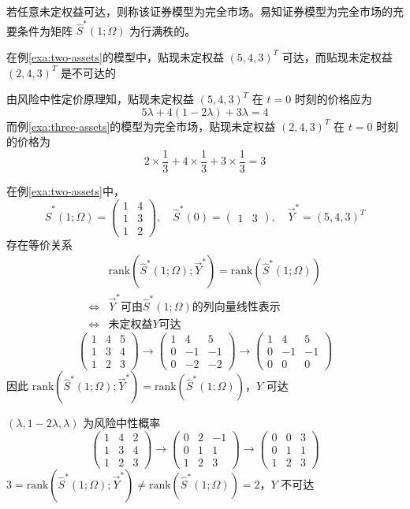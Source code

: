 若任意未定权益可达，则称该证券模型为完全市场。易知证券模型为完全市场的充要条件为矩阵 $\hat{S}^*(1;\Omega)$ 为行满秩的。

\begin{example}
    在例\ref{exa:two-assets}的模型中，贴现未定权益 $(5,4,3)^T$ 可达，而贴现未定权益 $(2,4,3)^T$ 是不可达的

    由风险中性定价原理知，贴现未定权益 $(5,4,3)^T$ 在 $t=0$ 时刻的价格应为
    \[
    5\lambda+4(1-2\lambda)+3\lambda=4
    \]
    而例\ref{exa:three-assets}的模型为完全市场，贴现未定权益 $(2,4,3)^T$ 在 $t=0$ 时刻的价格为
    \[
    2\times \frac{1}{3}+4\times \frac{1}{3}+3\times \frac{1}{3}=3
    \]
\end{example}

在例\ref{exa:two-assets}中，
\[
\hat{S}^*(1;\Omega)=\begin{pmatrix}
    1&4\\1&3\\1&2
\end{pmatrix},\quad \hat{S}^*(0)=\begin{pmatrix}
    1&3
\end{pmatrix},\quad \overrightarrow{Y}^*=(5,4,3)^T
\]
存在等价关系
\[
\begin{aligned}
    &\text{rank}(\hat{S}^*(1;\Omega);\overrightarrow{Y}^*)=\text{rank}(\hat{S}^*(1;\Omega))\\
    \Leftrightarrow& \overrightarrow{Y}^* \text{可由} \hat{S}^*(1;\Omega) \text{的列向量线性表示}\\
    \Leftrightarrow& \text{未定权益} Y \text{可达}
\end{aligned}
\]
\[
\begin{pmatrix}
    1&4&5\\
    1&3&4\\
    1&2&3
\end{pmatrix}\to \begin{pmatrix}
    1&4&5\\
    0&-1&-1\\
    0&-2&-2
\end{pmatrix}\to \begin{pmatrix}
    1&4&5\\
    0&-1&-1\\
    0&0&0
\end{pmatrix}
\]
因此 $\text{rank}(\hat{S}^*(1;\Omega);\overrightarrow{Y}^*)=\text{rank}(\hat{S}^*(1;\Omega))$，$Y$ 可达

$(\lambda,1-2\lambda,\lambda)$ 为风险中性概率
\[
\begin{pmatrix}
    1&4&2\\
    1&3&4\\
    1&2&3
\end{pmatrix}\to \begin{pmatrix}
    0&2&-1\\
    0&1&1\\
    1&2&3
\end{pmatrix}\to \begin{pmatrix}
    0&0&3\\
    0&1&1\\
    1&2&3
\end{pmatrix}
\]
$3=\text{rank}(\hat{S}^*(1;\Omega);\overrightarrow{Y}^*)\neq\text{rank}(\hat{S}^*(1;\Omega))=2$，$Y$ 不可达

